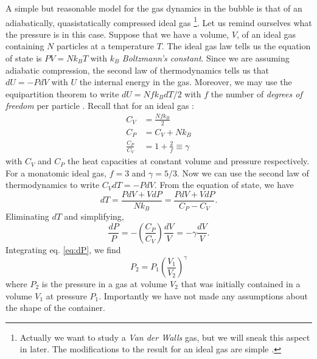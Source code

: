 \documentclass[rmp,aps,nofootinbib,superscriptaddress,floatfix]{revtex4-2}
\begin{document}
A simple but reasonable model for the gas dynamics in the bubble is that of an adiabatically, quasistatically compressed ideal gas \cite{brenner2002single} \footnote{Actually we want to study a \emph{Van der Walls} gas, but we will sneak this aspect in later. The modifications to the result for an ideal gas are simple \cite{sivasubramanian2002temperature}.}. Let us remind ourselves what the pressure is in this case. Suppose that we have a volume, $V$, of an ideal gas containing $N$ particles at a temperature $T$. The ideal gas law tells us the equation of state is $PV=Nk_BT$ with $k_B$ \emph{Boltzmann's constant}. Since we are assuming adiabatic compression, the second law of thermodynamics tells us that $dU=-PdV$ with $U$ the internal energy in the gas. Moreover, we may use the equipartition theorem to write $dU=N f k_B dT/2$ with $f$ the number of \emph{degrees of freedom} per particle \cite{}. Recall that for an ideal gas \cite{}:
\begin{equation}
\begin{split}
    C_V &= \frac{N f k_B}{2} \\
    C_P &= C_V+N k_B \\
    \frac{C_P}{C_V} &= 1+\frac{2}{f} \equiv \gamma 
\end{split}
\end{equation}
with $C_V$ and $C_P$ the heat capacities at constant volume and pressure respectively. For a monatomic ideal gas, $f=3$ and $\gamma=5/3$. Now we can use the second law of thermodynamics to write $C_V dT = -P dV$. From the equation of state, we have
\begin{equation}
    dT = \frac{PdV+VdP}{Nk_B}=\frac{PdV+VdP}{C_P-C_V}.
\end{equation}
Eliminating $dT$ and simplifying, 
\begin{equation}
    \frac{dP}{P}=-\left(\frac{C_P}{C_V}\right) \frac{dV}{V} = -\gamma \frac{dV}{V}.
    \label{eq:dP}
\end{equation}
Integrating eq. \ref{eq:dP}, we find 
\begin{equation}
    P_2 = P_1 \left(\frac{V_1}{V_2}\right)^\gamma
\label{eq:P}
\end{equation}
where $P_2$ is the pressure in a gas at volume $V_2$ that was initially contained in a volume $V_1$ at pressure $P_1$. Importantly we have not made any assumptions about the shape of the container. 
\end{document}
